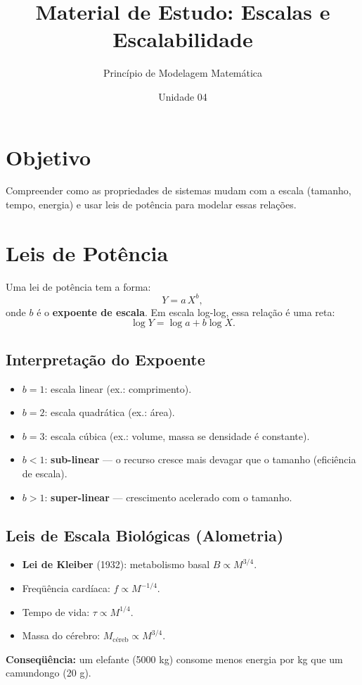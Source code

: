 \documentclass[12pt,a4paper]{article}
\title{Material de Estudo: Escalas e Escalabilidade}
\author{Princ\'ipio de Modelagem Matem\'atica}
\date{Unidade 04}
\begin{document}
\maketitle

\section*{Objetivo}
Compreender como as propriedades de sistemas mudam com a escala (tamanho, tempo, energia) e usar leis de pot\^encia para modelar essas rela\c{c}\~oes.

\section*{Leis de Pot\^encia}
Uma lei de pot\^encia tem a forma:
\[
Y = a\,X^b,
\]
onde $b$ \'e o \textbf{expoente de escala}. Em escala log-log, essa rela\c{c}\~ao \'e uma reta:
\[
\log Y = \log a + b \log X.
\]

\subsection*{Interpreta\c{c}\~ao do Expoente}
\begin{itemize}
  \item $b=1$: escala linear (ex.: comprimento).
  \item $b=2$: escala quadr\'atica (ex.: \'area).
  \item $b=3$: escala c\'ubica (ex.: volume, massa se densidade \'e constante).
  \item $b<1$: \textbf{sub-linear} --- o recurso cresce mais devagar que o tamanho (efici\^encia de escala).
  \item $b>1$: \textbf{super-linear} --- crescimento acelerado com o tamanho.
\end{itemize}

\subsection*{Leis de Escala Biol\'ogicas (Alometria)}
\begin{itemize}
  \item \textbf{Lei de Kleiber} (1932): metabolismo basal $B \propto M^{3/4}$.
  \item Freq\"u\^encia card\'iaca: $f \propto M^{-1/4}$.
  \item Tempo de vida: $\tau \propto M^{1/4}$.
  \item Massa do c\'erebro: $M_\text{c\'ereb} \propto M^{3/4}$.
\end{itemize}
\textbf{Conseq\"u\^encia:} um elefante (5000 kg) consome menos energia por kg que um camundongo (20 g).
\end{document}
